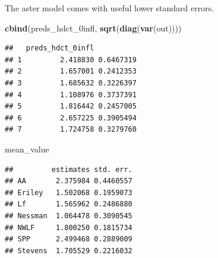 \documentclass[
  ignorenonframetext,
]{beamer}
\newenvironment{Shaded}{\begin{snugshade}}{\end{snugshade}}
\newcommand{\FunctionTok}[1]{\textcolor[rgb]{0.13,0.29,0.53}{\textbf{#1}}}
\newcommand{\NormalTok}[1]{#1}
\begin{document}
\begin{frame}[fragile]{}
\protect\hypertarget{section-45}{}
The aster model comes with useful lower standard errors.

\vspace{12pt}
\tiny

\begin{Shaded}
\begin{Highlighting}[]
\FunctionTok{cbind}\NormalTok{(preds\_hdct\_0infl, }\FunctionTok{sqrt}\NormalTok{(}\FunctionTok{diag}\NormalTok{(}\FunctionTok{var}\NormalTok{(out))))}
\end{Highlighting}
\end{Shaded}

\begin{verbatim}
##   preds_hdct_0infl          
## 1         2.418830 0.6467319
## 2         1.657001 0.2412353
## 3         1.685632 0.3226397
## 4         1.108976 0.3737391
## 5         1.816442 0.2457005
## 6         2.657225 0.3905494
## 7         1.724758 0.3279760
\end{verbatim}

\begin{Shaded}
\begin{Highlighting}[]
\NormalTok{mean\_value}
\end{Highlighting}
\end{Shaded}

\begin{verbatim}
##         estimates std. err.
## AA       2.375984 0.4460557
## Eriley   1.502068 0.1959073
## Lf       1.565962 0.2486880
## Nessman  1.064478 0.3090545
## NWLF     1.800250 0.1815734
## SPP      2.499468 0.2889009
## Stevens  1.705529 0.2216032
\end{verbatim}
\end{frame}
\end{document}
